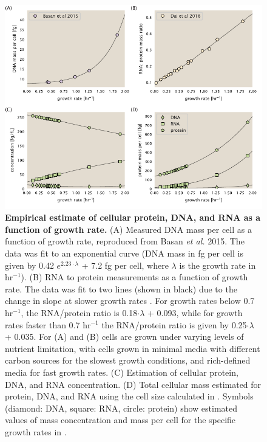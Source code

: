 \begin{figure}
		\centering
    \includegraphics[width=1\textwidth]{SI_figs/schmidt_estimate_protein_RNA_DNA_corrections.pdf}
  \caption{{\bf Empirical estimate of cellular protein, DNA, and RNA as a
  function of growth rate.} (A) Measured DNA mass per cell as a function of
  growth rate, reproduced from Basan \textit{et al.} 2015. The data was fit to
  an exponential curve (DNA mass in fg per cell is given by 0.42 $e^{2.23 \cdot
  \lambda}$ + 7.2 fg per cell, where $\lambda$ is the growth rate in hr$^{-1}$).
  (B) RNA to protein measurements as a function of growth rate. The data was fit
  to two lines (shown in black) due to the change in slope at slower growth rates \cite{neidhardt1991, dai2016}.
  For growth rates below 0.7 hr$^{-1}$, the RNA/protein ratio is
  0.18$\cdot \lambda$ + 0.093, while for growth rates faster than 0.7 hr$^{-1}$
  the RNA/protein ratio is given by 0.25$\cdot \lambda$ + 0.035. For (A) and (B)
  cells are grown under varying levels of nutrient limitation, with cells grown
  in minimal media with different carbon sources for the slowest growth
  conditions, and rich-defined media for fast growth rates. (C) Estimation of
  cellular protein, DNA, and RNA concentration.  (D) Total cellular mass
  estimated for protein, DNA, and RNA using the cell size calculated in  . Symbols (diamond: DNA, square: RNA, circle: protein)
	show estimated values of mass concentration and mass per cell for the specific
	growth rates in \cite{schmidt2016}.
	 	}
  \label{fig:schmidt_adjustment_varying_conc}
\end{figure}

